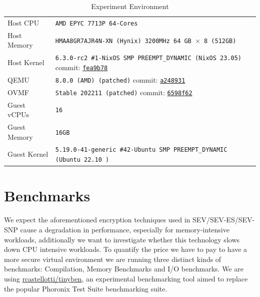 \documentclass[twocolumn]{article}
\begin{document}
\begin{table}[ht]
    \small
    \centering
    \label{tab:experiment-environment}
    \begin{tabular}{l|l}
        \hline
        Host CPU      & \texttt{AMD EPYC 7713P 64-Cores}                                            \\
        Host Memory   & \texttt{HMAA8GR7AJR4N-XN (Hynix) 3200MHz 64 GB $\times$ 8 (512GB)}          \\
        Host Kernel   & \texttt{6.3.0-rc2 \#1-NixOS SMP PREEMPT\_DYNAMIC (NixOS 23.05)} commit: \href{https://github.com/AMDESE/linux/tree/fea9b785bfa90e015c7d81526e36060da1bf01d1}{\texttt{fea9b78}}            \\
        QEMU          & \texttt{8.0.0 (AMD) (patched)} commit: \href{https://github.com/AMDESE/qemu/tree/a248931547843b9edb0f3b0c7d6d0c76ffdf7659}{\texttt{a248931}}                                             \\
        OVMF          & \texttt{Stable 202211 (patched)} commit: \href{https://github.com/AMDESE/ovmf/commit/6598f62bda4eb884c65d6c0aed7ede64258a41d8}{\texttt{6598f62}}                                     \\
        Guest vCPUs   & \texttt{16}                                                                 \\
        Guest Memory  & \texttt{16GB}                                                               \\
        Guest Kernel  & \texttt{5.19.0-41-generic \#42-Ubuntu SMP PREEMPT\_DYNAMIC (Ubuntu 22.10 )} \\ 
        \hline
    \end{tabular}
    \caption{Experiment Environment}
\end{table}

\section{Benchmarks}
We expect the aforementioned encryption techniques used in SEV/SEV-ES/SEV-SNP cause a degradation in performance, especially for memory-intensive workloads, additionally we want to investigate whether this technology slows down CPU intensive workloads. To quantify the price we have to pay to have a more secure virtual environment we are running three distinct kinds of benchmarks: Compilation, Memory Benchmarks and I/O benchmarks. We are using \href{https://github.com/rcastellotti/tinyben}{rcastellotti/tinyben}, an experimental benchmarking tool aimed to replace the popular Phoronix Test Suite \cite{pts} benchmarking suite.
\end{document}
